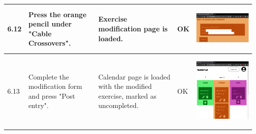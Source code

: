 \documentclass[12pt,twoside,titlepage,a4paper]{article}
\theoremstyle{definicion}
\theoremstyle{lema}
\theoremstyle{teorema}
\theoremstyle{corolario}
\theoremstyle{ejemplo}
\theoremstyle{nota}
\begin{document}
\begin{table}[!h]
\begin{tabular}{|m{0.6cm}|m{2.9cm}|m{3.6cm}|m{1.1cm}|m{5.9cm}|}
		\hline
		6.12 & Press the orange pencil under "Cable Crossovers". & Exercise modification page is loaded. & OK &
		\begin{center}\includegraphics[scale=0.22]{modifystr.png}\end{center} \\
		\hline
		6.13 & Complete the modification form and press "Post entry". & Calendar page is loaded with the modified exercise, 
		marked as uncompleted. & OK &
		\begin{center}\includegraphics[scale=0.22]{calendar6.png}\end{center} \\

\end{tabular}
\end{table}
\end{document}
